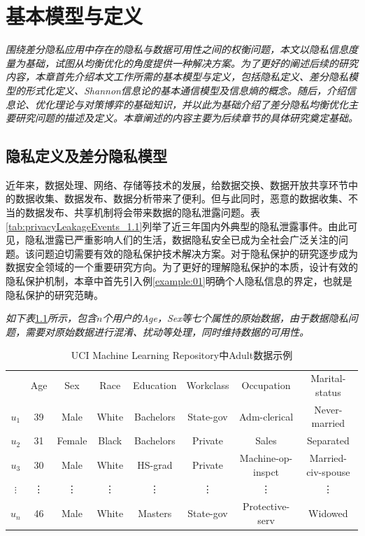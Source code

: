 \chapter{基本模型与定义}\label{chapter02}

{\em 围绕差分隐私应用中存在的隐私与数据可用性之间的权衡问题，本文以隐私信息度量为基础，试图从均衡优化的角度提供一种解决方案。为了更好的阐述后续的研究内容，本章首先介绍本文工作所需的基本模型与定义，包括隐私定义、差分隐私模型的形式化定义、Shannon信息论的基本通信模型及信息熵的概念。随后，介绍信息论、优化理论与对策博弈的基础知识，并以此为基础介绍了差分隐私均衡优化主要研究问题的描述及定义。本章阐述的内容主要为后续章节的具体研究奠定基础。}

\section{隐私定义及差分隐私模型}
近年来，数据处理、网络、存储等技术的发展，给数据交换、数据开放共享环节中的数据收集、数据发布、数据分析带来了便利。但与此同时，恶意的数据收集、不当的数据发布、共享机制将会带来数据的隐私泄露问题。表\ref{tab:privacyLeakageEvents_1.1}列举了近三年国内外典型的隐私泄露事件。由此可见，隐私泄露已严重影响人们的生活，数据隐私安全已成为全社会广泛关注的问题。该问题迫切需要有效的隐私保护技术解决方案。对于隐私保护的研究逐步成为数据安全领域的一个重要研究方向。为了更好的理解隐私保护的本质，设计有效的隐私保护机制，本章中首先引入例\ref{example:01}明确个人隐私信息的界定，也就是隐私保护的研究范畴。

\begin{example}\label{example:01}{\em 如下表}\ref{tab:origin}{\em 所示，包含$n$个用户的Age，Sex等七个属性的原始数据，由于数据隐私问题，需要对原始数据进行混淆、扰动等处理，同时维持数据的可用性。
	}
	\begin{table}[h!]
		\small
		\centering\caption{UCI Machine Learning Repository中Adult数据示例}
		\begin{tabular}{c|c|c|c|c|c|c|c|}
			\cline{2-8}
			& Age & Sex & Race & Education &Workclass &Occupation &Marital-status \\
			\cline{2-8}
			$u_1$ & 39 & Male & White & Bachelors& State-gov & Adm-clerical & Never-married \\
			$u_2$ & 31 & Female & Black & Bachelors &  Private &  Sales & Separated\\
			$u_{3}$ & 30 & Male& White & HS-grad  & Private  & Machine-op-inspct  & Married-civ-spouse\\
			$\vdots$ & \vdots & \vdots & \vdots & \vdots & \vdots & \vdots & \vdots \\
			$u_n$ & 46 & Male & White & Masters  & State-gov  & Protective-serv  &Widowed\\
			\cline{2-8}
		\end{tabular}\label{tab:origin}
	\end{table}
\end{example}


